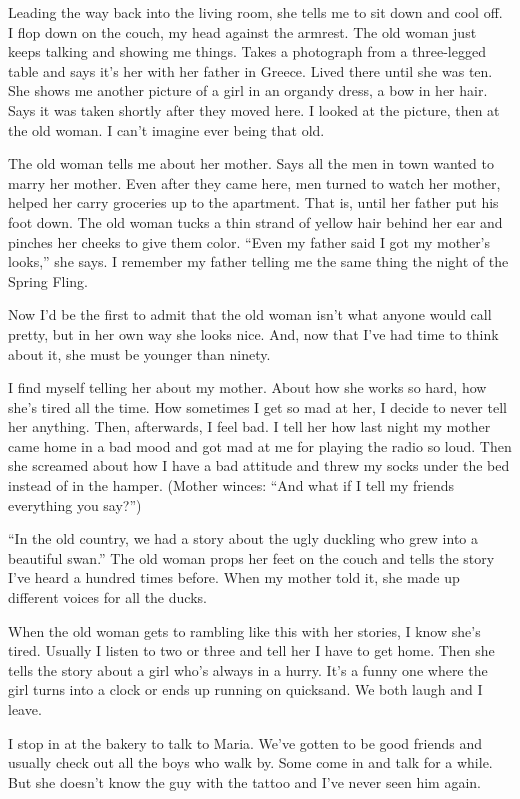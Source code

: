 \documentclass[
]{article}
\begin{document}
Leading the way back into the living room, she tells me to sit down and
cool off. I flop down on the couch, my head against the armrest. The old
woman just keeps talking and showing me things. Takes a photograph from
a three-legged table and says it's her with her father in Greece. Lived
there until she was ten. She shows me another picture of a girl in an
organdy dress, a bow in her hair. Says it was taken shortly after they
moved here. I looked at the picture, then at the old woman. I can't
imagine ever being that old.

The old woman tells me about her mother. Says all the men in town wanted
to marry her mother. Even after they came here, men turned to watch her
mother, helped her carry groceries up to the apartment. That is, until
her father put his foot down. The old woman tucks a thin strand of
yellow hair behind her ear and pinches her cheeks to give them color.
``Even my father said I got my mother's looks,'' she says. I remember my
father telling me the same thing the night of the Spring Fling.

Now I'd be the first to admit that the old woman isn't what anyone would
call pretty, but in her own way she looks nice. And, now that I've had
time to think about it, she must be younger than ninety.

I find myself telling her about my mother. About how she works so hard,
how she's tired all the time. How sometimes I get so mad at her, I
decide to never tell her anything. Then, afterwards, I feel bad. I tell
her how last night my mother came home in a bad mood and got mad at me
for playing the radio so loud. Then she screamed about how I have a bad
attitude and threw my socks under the bed instead of in the hamper.
(Mother winces: ``And what if I tell my friends everything you say?'')

``In the old country, we had a story about the ugly duckling who grew
into a beautiful swan.'' The old woman props her feet on the couch and
tells the story I've heard a hundred times before. When my mother told
it, she made up different voices for all the ducks.

When the old woman gets to rambling like this with her stories, I know
she's tired. Usually I listen to two or three and tell her I have to get
home. Then she tells the story about a girl who's always in a hurry.
It's a funny one where the girl turns into a clock or ends up running on
quicksand. We both laugh and I leave.

I stop in at the bakery to talk to Maria. We've gotten to be good
friends and usually check out all the boys who walk by. Some come in and
talk for a while. But she doesn't know the guy with the tattoo and I've
never seen him again.
\end{document}
